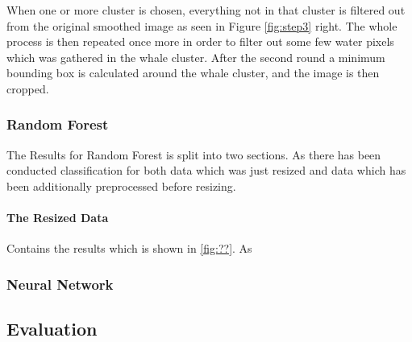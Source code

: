 When one or more cluster is chosen, everything not in that cluster is filtered out from the original smoothed image as seen in Figure \ref{fig:step3} right. The whole process is then repeated once more in order to filter out some few water pixels which was gathered in the whale cluster.
After the second round a minimum bounding box is calculated around the whale cluster, and the image is then cropped.



\subsubsection{Random Forest}
The Results for Random Forest is split into two sections. As there has been conducted classification for both data which was just resized and data which has been additionally preprocessed before resizing.

\paragraph{The Resized Data} 
Contains the results which is shown in \ref{fig:??}. As 


\subsubsection{Neural Network}



\subsection{Evaluation}
\label{subsec:evaluation}